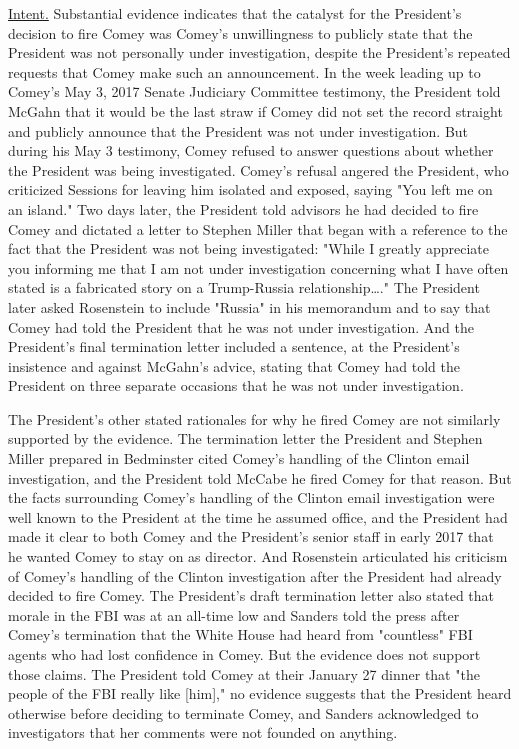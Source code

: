 {\underline{Intent.}
Substantial evidence indicates that the catalyst for the President's decision to fire Comey was Comey's unwillingness to publicly state that the President was not personally under investigation, despite the President's repeated requests that Comey make such an announcement.
In the week leading up to Comey's May 3, 2017 Senate Judiciary Committee testimony, the President told McGahn that it would be the last straw if Comey did not set the record straight and publicly announce that the President was not under investigation.
But during his May 3 testimony, Comey refused to answer questions about whether the President was being investigated.
Comey's refusal angered the President, who criticized Sessions for leaving him isolated and exposed, saying "You left me on an island."
Two days later, the President told advisors he had decided to fire Comey and dictated a letter to Stephen Miller that began with a reference to the fact that the President was not being investigated:
"While I greatly appreciate you informing me that I am not under investigation concerning what I have often stated is a fabricated story on a Trump-Russia relationship\dots."
The President later asked Rosenstein to include "Russia" in his memorandum and to say that Comey had told the President that he was not under investigation.
And the President's final termination letter included a sentence, at the President's insistence and against McGahn's advice, stating that Comey had told the President on three separate occasions that he was not under investigation.

The President's other stated rationales for why he fired Comey are not similarly supported by the evidence.
The termination letter the President and Stephen Miller prepared in Bedminster cited Comey's handling of the Clinton email investigation, and the President told McCabe he fired Comey for that reason.
But the facts surrounding Comey's handling of the Clinton email investigation were well known to the President at the time he assumed office, and the President had made it clear to both Comey and the President's senior staff in early 2017 that he wanted Comey to stay on as director.
And Rosenstein articulated his criticism of Comey's handling of the Clinton investigation after the President had already decided to fire Comey.
The President's draft termination letter also stated that morale in the FBI was at an all-time low and Sanders told the press after Comey's termination that the White House had heard from "countless" FBI agents who had lost confidence in Comey.
But the evidence does not support those claims.
The President told Comey at their January 27 dinner that "the people of the FBI really like [him]," no evidence suggests that the President heard otherwise before deciding to terminate Comey, and Sanders acknowledged to investigators that her comments were not founded on anything.

}
